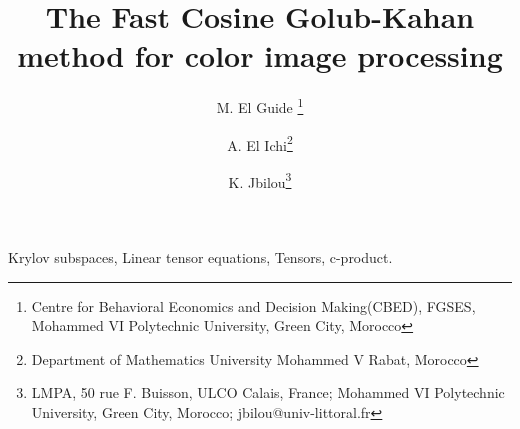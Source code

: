 \documentclass{siamltex}
\title{The Fast Cosine Golub-Kahan method for  color  image processing}
\author{M. El Guide \thanks{Centre for Behavioral Economics and Decision Making(CBED), FGSES, Mohammed VI Polytechnic University, Green City, Morocco} \and A. El Ichi\footnotemark [3]\thanks{Department of Mathematics University Mohammed V Rabat, Morocco}   \and K. Jbilou\footnotemark[1] \thanks{LMPA, 50 rue F. Buisson, ULCO Calais, France; Mohammed VI Polytechnic University, Green City, Morocco; jbilou@univ-littoral.fr }}
\date{}
\newcommand{\1}{\mathbb{1}}
\newcommand{\0}{\mathbb{0}}
\begin{document}
	
	
	
	
	
	
	\maketitle
	
	
	
	
	
	
	\begin{abstract}    
	\end{abstract}   
	
	
	  Krylov subspaces, Linear tensor equations,  Tensors, c-product.
	
\end{document}
